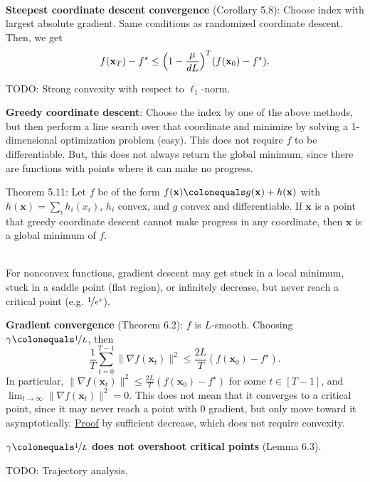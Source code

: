 \documentclass{article}
\newcommand{\lft}{\mathopen{}\mathclose\bgroup\left}
\newcommand{\rgt}{\aftergroup\egroup\right}
\renewcommand{\vec}[1]{\mathbf{#1}}
\newenvironment{topic}[1]
{\textbf{\sffamily \colorbox{black}{\rlap{\textbf{\textcolor{white}{#1}}}\hspace{\linewidth}\hspace{-2\fboxsep}}} \\ \vspace{0.2cm}}
{}
\begin{document}
\begin{multicols*}{2}
\begin{topic}{5 Coordinate descent}
        \textbf{Steepest coordinate descent convergence} (Corollary 5.8): Choose index with largest
        absolute gradient. Same conditions as randomized coordinate descent. Then, we get \[
            f(\vec{x}_T) - f^\star \leq \lft( 1 - \frac{\mu}{dL} \rgt)^T (f(\vec{x}_0) - f^\star).
        \]

        TODO: Strong convexity with respect to $\ell_1$-norm.

        \textbf{Greedy coordinate descent}: Choose the index by one of the above methods, but then
        perform a line search over that coordinate and minimize by solving a 1-dimensional
        optimization problem (easy). This does not require $f$ to be differentiable. But, this does
        not always return the global minimum, since there are functions with points where it can make
        no progress.

        Theorem 5.11: Let $f$ be of the form $f(\vec{x}) \colonequals g(\vec{x}) + h(\vec{x})$ with
        $h(\vec{x}) = \sum_{i} h_i(x_i)$, $h_i$ convex, and $g$ convex and differentiable. If $\vec{x}$ is
        a point that greedy coordinate descent cannot make progress in any coordinate, then $\vec{x}$ is a
        global minimum of $f$.
    \end{topic}

    \begin{topic}{6 Nonconvex functions}
        For nonconvex functions, gradient descent may get stuck in a local minimum, stuck in a saddle
        point (flat region), or infinitely decrease, but never reach a critical point (e.g. $\nicefrac{1}{e^x}$).

        \textbf{Gradient convergence} (Theorem 6.2): $f$ is $L$-smooth. Choosing $\gamma \colonequals \nicefrac{1}{L}$, then \[
            \frac{1}{T} \sum_{t=0}^{T-1} \| \nabla f(\vec{x}_t) \|^2 \leq \frac{2L}{T} (f(\vec{x}_0) - f^\star).
        \]
        In particular, $\| \nabla f(\vec{x}_t) \|^2 \leq \frac{2L}{T} (f(\vec{x}_0) - f^\star)$ for some $t
            \in [T-1]$, and $\lim_{t \to \infty} \| \nabla f(\vec{x}_t) \|^2 = 0$. This does not mean that it
        converges to a critical point, since it may never reach a point with 0 gradient, but only move
        toward it asymptotically. \underline{Proof} by sufficient decrease, which does not require
        convexity.

        \textbf{$\gamma \colonequals \nicefrac{1}{L}$ does not overshoot critical points} (Lemma 6.3).

        TODO: Trajectory analysis.
    \end{topic}


\end{multicols*}
\end{document}
